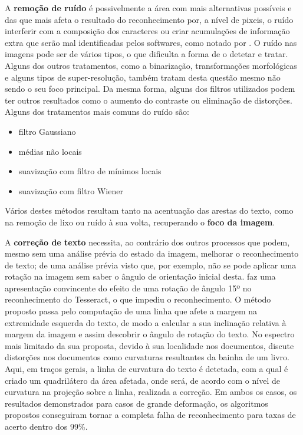 A \textbf{remoção de ruído} é possivelmente a área com mais alternativas possíveis e das que mais afeta o resultado do reconhecimento por, a nível de pixeis, o ruído interferir com a composição dos caracteres ou criar acumulações de informação extra que serão mal identificadas pelos softwares, como notado por \cite{4283429}. 
O ruído nas imagens pode ser de vários tipos, o que dificulta a forma de o detetar e tratar. 
Alguns dos outros tratamentos, como a binarização, transformações morfológicas e alguns tipos de super-resolução, também tratam desta questão mesmo não sendo o seu foco principal.  Da mesma forma, alguns dos filtros utilizados podem ter outros resultados como o aumento do contraste ou eliminação de distorções.
Alguns dos tratamentos mais comuns do ruído são\citep{9791698}\citep{8269967}\citep{4283429}:
\begin{itemize}
    \item filtro Gaussiano
    \item médias não locais
    \item suavização com filtro de mínimos locais
    \item suavização com filtro Wiener
\end{itemize}
Vários destes métodos resultam  tanto na acentuação das arestas do texto, como na remoção de lixo ou ruído à sua volta,  recuperando o \textbf{foco da imagem}.

A \textbf{correção de texto} necessita, ao contrário dos outros processos que podem, mesmo sem uma análise prévia do estado da imagem, melhorar o reconhecimento de texto; de uma análise prévia visto que, por exemplo, não se pode aplicar uma rotação na imagem sem saber o ângulo de orientação inicial desta. 
\cite{4283429} faz uma apresentação convincente do efeito de uma rotação de ângulo 15º no reconhecimento do Tesseract, o que impediu o reconhecimento.
O método proposto passa pelo computação de uma linha que afete a margem na extremidade esquerda do texto, de modo a calcular a sua inclinação relativa à margem da imagem e assim descobrir o ângulo de rotação do texto.
No espectro mais limitado da sua proposta, devido à sua localidade nos documentos, \cite{4283429} discute distorções nos documentos como curvaturas resultantes da bainha de um livro. Aqui, em traços gerais, a linha de curvatura do texto é detetada, com a qual é criado um quadrilátero da área afetada, onde será, de acordo com o nível de curvatura na projeção sobre a linha, realizada a correção.
Em ambos os casos, os resultados demonstrados para casos de grande deformação, os algoritmos propostos conseguiram tornar a completa falha de reconhecimento para taxas de acerto dentro dos 99\%.

